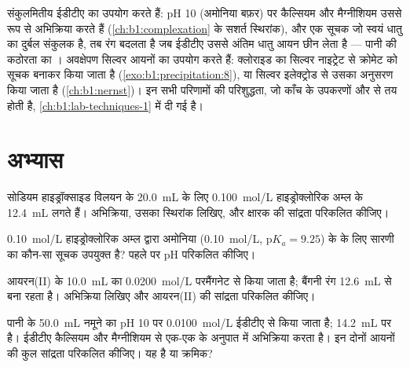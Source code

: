 संकुलमितीय  ईडीटीए का उपयोग करते हैं: pH 10 (अमोनिया बफ़र) पर कैल्सियम
और मैग्नीशियम उससे  रूप से अभिक्रिया करते हैं (\cref{ch:b1:complexation} के
सशर्त स्थिरांक), और एक सूचक जो स्वयं धातु का दुर्बल
संकुलक है, तब रंग बदलता है जब ईडीटीए उससे अंतिम
धातु आयन छीन लेता है --- पानी की कठोरता का । अवक्षेपण
 सिल्वर आयनों का उपयोग करते हैं: क्लोराइड का सिल्वर नाइट्रेट से 
क्रोमेट को सूचक बनाकर किया जाता है (\cref{exo:b1:precipitation:8}), या
सिल्वर इलेक्ट्रोड से उसका अनुसरण किया जाता है (\cref{ch:b1:nernst})। इन सभी परिणामों की
परिशुद्धता, जो काँच के उपकरणों और  से तय होती है,
\cref{ch:b1:lab-techniques-1} में दी गई है।

\section{अभ्यास}

\begin{exercise}[$\star$]\label{exo:b1:titration-methods:1}
सोडियम हाइड्रॉक्साइड विलयन के \qty{20.0}{mL} के लिए \qty{0.100}{mol/L}
हाइड्रोक्लोरिक अम्ल के \qty{12.4}{mL} लगते हैं। अभिक्रिया, उसका स्थिरांक लिखिए,
और क्षारक की सांद्रता परिकलित कीजिए।
\end{exercise}

\begin{exercise}[$\star$]\label{exo:b1:titration-methods:2}
\qty{0.10}{mol/L} हाइड्रोक्लोरिक अम्ल द्वारा अमोनिया (\qty{0.10}{mol/L},
$\mathrm{p}K_a = 9.25$) के  के लिए सारणी का कौन-सा सूचक उपयुक्त है? पहले
 पर pH परिकलित कीजिए।
\end{exercise}

\begin{exercise}[$\star$]\label{exo:b1:titration-methods:3}
आयरन(II) के \qty{10.0}{mL} का \qty{0.0200}{mol/L} परमैंगनेट से
 किया जाता है; बैंगनी रंग \qty{12.6}{mL} से बना रहता है।
अभिक्रिया लिखिए और आयरन(II) की सांद्रता परिकलित कीजिए।
\end{exercise}

\begin{exercise}[$\star$]\label{exo:b1:titration-methods:4}
पानी के \qty{50.0}{mL} नमूने का pH 10 पर \qty{0.0100}{mol/L} ईडीटीए से
 किया जाता है;  \qty{14.2}{mL} पर है। ईडीटीए
कैल्सियम और मैग्नीशियम से एक-एक के अनुपात में अभिक्रिया करता है। इन दोनों आयनों की कुल
सांद्रता परिकलित कीजिए। यह  है या क्रमिक?
\end{exercise}

